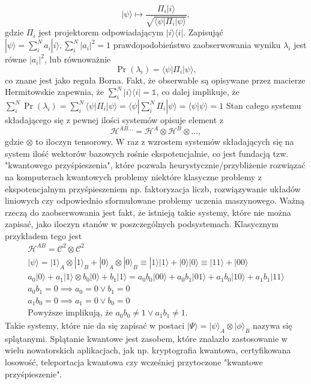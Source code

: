 \documentclass[10pt]{article} %
\newcommand{\Hx}[1]{\mathcal{H}^{#1}}
\newcommand{\Pro}[1]{\Pr(#1)}
\newcommand{\Ket}[1]{|#1\rangle}
\newcommand{\Bra}[1]{\langle#1|}
\newcommand{\Braket}[1]{\langle#1\rangle}
\newcommand{\KP}{\Ket{\psi}}
\newcommand{\BP}{\Bra{\psi}}
\begin{document}
\begin{equation}
\label{eq:cond_ev}
\Ket{\psi} \mapsto \frac{\Pi_i\Ket{i}}{\sqrt{\Bra{\psi}\Pi_i \Ket{\psi}}},
\end{equation}
gdzie $\Pi_i$ jest projektorem odpowiadającym $\Ket{i}\Bra{i}$. Zapisująć $\KP = \sum^N_i a_i \Ket{i}, \sum^N_i |a_i|^2=1$ prawdopodobieństwo zaobserwowania wyniku $\lambda_i$ jest równe $|a_i|^2$, lub równoważnie
\begin{equation}
\Pro{\lambda_i} = \BP \Pi_i \KP,
\end{equation}
co znane jest jako reguła Borna. Fakt, że obserwable są opisywane przez macierze Hermitowskie zapewnia, że $\sum^N_i \Ket{i}\Bra{i} = \mathbb{1}$, co dalej implikuje, że $\sum^N_i \Pro{\lambda_i} = \sum^N_i \BP \Pi_i \KP = \BP \sum^N_i \Pi_i \KP = \Braket{\psi | \psi} = 1$
Stan całego systemu składającego się z pewnej ilości systemów opisuje element z
\begin{equation}
\Hx{AB\dots} = \Hx{A} \otimes \Hx{B} \otimes \dots,
\end{equation}
gdzie $\otimes$ to iloczyn tensorowy. W raz z wzrostem systemów składających się na system ilość wektorów bazowych rośnie ekspotencjalnie, co jest fundacją tzw. "kwantowego przyśpieszenia", które pozwala heurystycznie/przybliżenie rozwiązać na komputerach kwantowych problemy niektóre klasyczne problemy z ekspotencjalnym przyśpieszeniem
np. faktoryzacja liczb, rozwiązywanie układów liniowych czy odpowiednio sformułowane problemy uczenia maszynowego.
Ważną rzeczą do zaobserwowania jest fakt, że istnieją takie systemy, które nie można zapisać, jako iloczyn stanów w poszczególnych podsystemach. Klasycznym przykładem tego jest
\begin{gather*}
\Hx{AB} = \mathcal{C}^2 \otimes \mathcal{C}^2 \\
\KP = \Ket{1}_A \otimes \Ket{1}_B + \Ket{0}_A \otimes \Ket{0}_B \equiv \Ket{1}\Ket{1} + \Ket{0}\Ket{0} \equiv \Ket{11} + \Ket{00} \\
a_0\Ket{0} + a_1\Ket{1} \otimes b_0\Ket{0} + b_1\Ket{1} = a_0b_0 \Ket{00} + a_0b_1\Ket{01} + a_1b_0\Ket{10} + a_1b_1\Ket{11} \\
a_0b_1 = 0\implies a_0 = 0\vee b_1 = 0 \\
a_1b_0 = 0\implies a_1 = 0\vee b_0 = 0 \\
\text{Powyższe implikują, że } a_0b_0 \neq 1 \vee a_1b_1 \neq 1.
\end{gather*} Takie systemy, które nie da się zapisać w postaci $\Ket{\Psi} = \Ket{\psi}_A \otimes \Ket{\phi}_B$ nazywa się splątanymi. Splątanie kwantowe jest zasobem, które znalazło zastosowanie w wielu nowatorskich aplikacjach, jak np. kryptografia kwantowa, certyfikowana losowość, teleportacja kwantowa czy wcześniej przytoczone "kwantowe przyśpieszenie".
\end{document}
